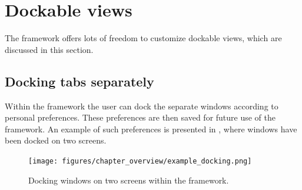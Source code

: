 
\section{Dockable views}
\label{sec:dockableviews}
The  framework offers lots of freedom to customize dockable views, which are discussed in this section.
\subsection{Docking tabs separately}
\label{subsec:dockingtabs}
Within the  framework the user can dock the separate windows according to personal preferences. These preferences are then saved for future use of the framework. An example of such preferences is presented in , where windows have been docked on two screens.
%
\begin{figure} [H]
	\centering
		\texttt{[image: figures/chapter\_overview/example\_docking.png]}
	\caption{Docking windows on two screens within the framework.}
	\label{fig:exampledocking}
\end{figure}

